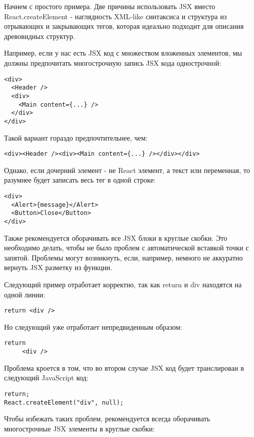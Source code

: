 Начнем с простого примера. Две причины использовать JSX вместо React.createElement - наглядность XML-like синтаксиса и структура из отрывающих и закрывающих тегов, которая идеально подходит для описания древовидных структур.

Например, если у нас есть JSX код с множеством вложенных элементов, мы должны предпочитать многострочную запись JSX кода однострочной:

\begin{lstlisting}
<div>
  <Header />
  <div>
    <Main content={...} />
  </div>
</div>
\end{lstlisting}

Такой вариант гораздо предпочтительнее, чем:

\begin{lstlisting}
<div><Header /><div><Main content={...} /></div></div>
\end{lstlisting}

Однако, если дочерний элемент - не React элемент, а текст или переменная, то разумнее будет записать весь тег в одной строке:

\begin{lstlisting}
<div>
  <Alert>{message}</Alert>
  <Button>Close</Button>
</div>
\end{lstlisting}

Также рекомендуется оборачивать все JSX блоки в круглые скобки. Это необходимо делать, чтобы не было проблем с автоматической вставкой точки с запятой. Проблемы могут возникнуть, если, например, немного не аккуратно вернуть JSX разметку из функции.

Следующий пример отработает корректно, так как return и div находятся на одной линии:

\begin{lstlisting}
return <div />
\end{lstlisting}

Но следующий уже отработает непредвиденным образом:

\begin{lstlisting}
return
     <div />
\end{lstlisting}
     
Проблема кроется в том, что во втором случае JSX код будет транслирован в следующий JavaScript код:

\begin{lstlisting}
return;
React.createElement("div", null);
\end{lstlisting}
   
Чтобы избежать таких проблем, рекомендуется всегда оборачивать многострочные JSX элементы в круглые скобки:

